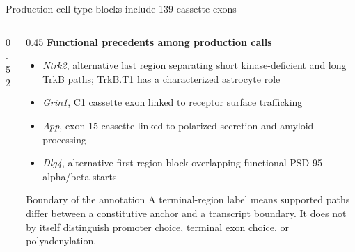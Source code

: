 \documentclass[aspectratio=169,10pt]{beamer}
\begin{document}
\begin{frame}{Production cell-type blocks include 139 cassette exons}
\begin{columns}[T,onlytextwidth]
\begin{column}{0.52\textwidth}
\end{column}
\begin{column}{0.45\textwidth}
\small
\textbf{Functional precedents among production calls}
\vspace{0.15cm}
\begin{itemize}\scriptsize
\item \textit{Ntrk2}, alternative last region separating short kinase-deficient and long TrkB paths; TrkB.T1 has a characterized astrocyte role
\item \textit{Grin1}, C1 cassette exon linked to receptor surface trafficking
\item \textit{App}, exon 15 cassette linked to polarized secretion and amyloid processing
\item \textit{Dlg4}, alternative-first-region block overlapping functional PSD-95 alpha/beta starts
\end{itemize}
\vspace{0.05cm}
\begin{alertblock}{Boundary of the annotation}
\scriptsize A terminal-region label means supported paths differ between a constitutive anchor and a transcript boundary. It does not by itself distinguish promoter choice, terminal exon choice, or polyadenylation.
\end{alertblock}
\end{column}
\end{columns}
\end{frame}
\end{document}
